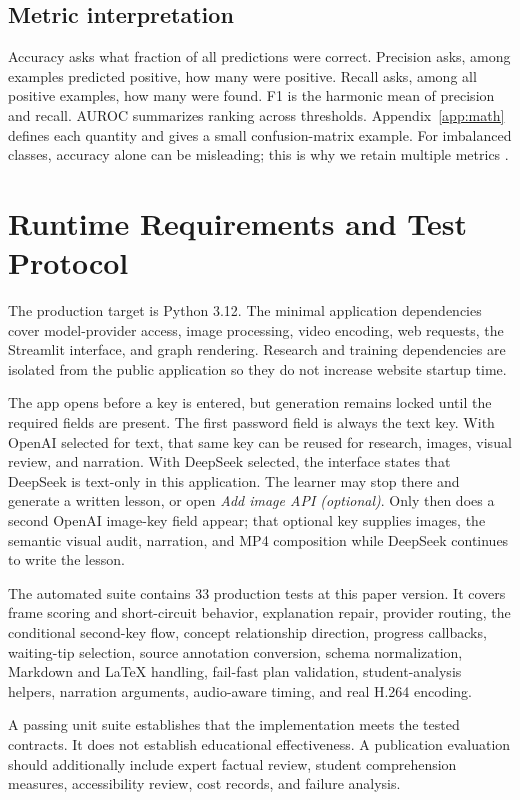 \documentclass[11pt]{article}
\theoremstyle{plain}
\theoremstyle{definition}
\begin{document}
\subsection{Metric interpretation}

Accuracy asks what fraction of all predictions were correct. Precision asks, among examples predicted positive, how many were positive. Recall asks, among all positive examples, how many were found. F1 is the harmonic mean of precision and recall. AUROC summarizes ranking across thresholds. Appendix~\ref{app:math} defines each quantity and gives a small confusion-matrix example. For imbalanced classes, accuracy alone can be misleading; this is why we retain multiple metrics \citep{fawcett2006roc}.

\section{Runtime Requirements and Test Protocol}

The production target is Python 3.12. The minimal application dependencies cover model-provider access, image processing, video encoding, web requests, the Streamlit interface, and graph rendering. Research and training dependencies are isolated from the public application so they do not increase website startup time.

The app opens before a key is entered, but generation remains locked until the required fields are present. The first password field is always the text key. With OpenAI selected for text, that same key can be reused for research, images, visual review, and narration. With DeepSeek selected, the interface states that DeepSeek is text-only in this application. The learner may stop there and generate a written lesson, or open \emph{Add image API (optional)}. Only then does a second OpenAI image-key field appear; that optional key supplies images, the semantic visual audit, narration, and MP4 composition while DeepSeek continues to write the lesson.

The automated suite contains 33 production tests at this paper version. It covers frame scoring and short-circuit behavior, explanation repair, provider routing, the conditional second-key flow, concept relationship direction, progress callbacks, waiting-tip selection, source annotation conversion, schema normalization, Markdown and LaTeX handling, fail-fast plan validation, student-analysis helpers, narration arguments, audio-aware timing, and real H.264 encoding.

A passing unit suite establishes that the implementation meets the tested contracts. It does not establish educational effectiveness. A publication evaluation should additionally include expert factual review, student comprehension measures, accessibility review, cost records, and failure analysis.
\end{document}
